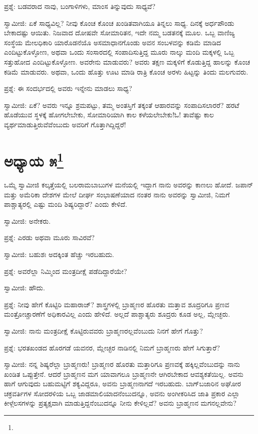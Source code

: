 ಪ್ರಶ್ನೆ: ಬಡವರಾದ ನಾವು, ಬಂಗಾಳಿಗಳು, ಮಾಂಸ ತಿನ್ನುವುದು ಸಾಧ್ಯವೆ?

ಸ್ವಾಮೀಜಿ: ಏಕೆ ಸಾಧ್ಯವಿಲ್ಲ? ನೀವು ಕೊಂಚ ಕೊಂಚ ಖಂಡಿತವಾಗಿಯೂ ತಿನ್ನಲು ಸಾಧ್ಯ. ದಿನಕ್ಕೆ ಅರ್ಧಪೌಂಡು ಬೇಕಾದಷ್ಟು ಆಯಿತು. ನಿಜವಾದ ದೋಷವೇ ಸೋಮಾರಿತನ, ಇದೇ ನಮ್ಮ ಬಡತನಕ್ಕೆ ಮೂಲ. ಒಬ್ಬ ವಾಣಿಜ್ಯ ಸಂಸ್ಥೆಯ ಮೇಲಧಿಕಾರಿ ಯಾರೊಡನೆಯೊ ಅಸಮಾಧಾನಗೊಂಡು ಅವನ ಸಂಬಳವನ್ನು ಕಡಿಮೆ ಮಾಡಿದ ಎಂದಿಟ್ಟುಕೊಳ್ಳೋಣ, ಅಥವಾ ಒಂದು ಸಂಸಾರದಲ್ಲಿ ಸಂಪಾದಿಸುತ್ತಿದ್ದ ಮೂರು ನಾಲ್ಕು ಮಂದಿ ಮಕ್ಕಳಲ್ಲಿ ಒಬ್ಬ ಸತ್ತುಹೋದ ಎಂದಿಟ್ಟುಕೊಳ್ಳೋಣ. ಅವರೇನು ಮಾಡುವರು? ಅವರು ತಕ್ಷಣ ಮಕ್ಕಳಿಗೆ ಕೊಡುತ್ತಿದ್ದ ಹಾಲನ್ನು ಕೊಂಚ ಕಡಿಮೆ ಮಾಡುವರು. ಅಥವಾ, ಒಂದು ಹೊತ್ತು ಊಟ ಮಾಡಿ ರಾತ್ರಿ ಕೊಂಚ ಅರಳು ಹಿಟ್ಟನ್ನು ತಿಂದು ಮಲಗುವರು.

ಪ್ರಶ್ನೆ: ಈ ಸಂದರ್ಭದಲ್ಲಿ ಅವರು ಇನ್ನೇನು ಮಾಡಲು ಸಾಧ್ಯ?

ಸ್ವಾಮೀಜಿ: ಏಕೆ? ಅವರು ಇನ್ನೂ ಶ್ರಮಪಟ್ಟು, ತಮ್ಮ ಅಂತಸ್ತಿಗೆ ತಕ್ಕಂತೆ ಆಹಾರವನ್ನು ಸಂಪಾದಿಸಲಾರರೆ? ಹರಟೆ ಹೊಡೆಯುವ ಸ್ಥಳಕ್ಕೆ ಹೋಗಲೇಬೇಕು, ಸೋಮಾರಿಯಾಗಿ ಕಾಲ ಕಳೆಯಲೇಬೇಕು!ಓ! ತಾವೆಷ್ಟು ಕಾಲ ವ್ಯರ್ಥಮಾಡುತ್ತಿರುವೆವೆಂಬುದು ಅವರಿಗೆ ಗೊತ್ತಾಗಿದ್ದಿದ್ದರೆ!

\chapter{ಅಧ್ಯಾಯ ೫\protect\footnote{}}

ಒಮ್ಮೆ ಸ್ವಾಮೀಜಿ ಕಲ್ಕತ್ತೆಯಲ್ಲಿ ಬಲರಾಮಬಾಬುಗಳ ಮನೆಯಲ್ಲಿ ಇದ್ದಾಗ ನಾನು ಅವರನ್ನು ಕಾಣಲು ಹೋದೆ. ಜಪಾನ್ ಮತ್ತು ಅಮೆರಿಕಾ ದೇಶಗಳ ಮೇಲೆ ದೀರ್ಘ ಸಂಭಾಷಣೆಯಾದ ನಂತರ ನಾನು ಅವರನ್ನು ಸ್ವಾಮೀಜಿ, ನಿಮಗೆ ಪಾಶ್ಚಾತ್ಯರಲ್ಲಿ ಎಷ್ಟು ಮಂದಿ ಶಿಷ್ಯರಿದ್ದಾರೆ? ಎಂದು ಕೇಳಿದೆ.

ಸ್ವಾಮೀಜಿ: ಅನೇಕರು.

ಪ್ರಶ್ನೆ: ಎರಡು ಅಥವಾ ಮೂರು ಸಾವಿರವೆ?

ಸ್ವಾಮೀಜಿ: ಬಹುಶಃ ಅದಕ್ಕಿಂತ ಹೆಚ್ಚು ಇರಬಹುದು.

ಪ್ರಶ್ನೆ: ಅವರೆಲ್ಲಾ ನಿಮ್ಮಿಂದ ಮಂತ್ರದೀಕ್ಷೆ ಪಡೆದಿದ್ದಾರೆಯೇ?

ಸ್ವಾಮೀಜಿ: ಹೌದು.

ಪ್ರಶ್ನೆ: ನೀವು ಹೇಗೆ ಕೊಟ್ಟಿರಿ ಮಹಾರಾಜ್? ಶಾಸ್ತ್ರಗಳಲ್ಲಿ ಬ್ರಾಹ್ಮಣರ ಹೊರತು ಮತ್ತಾವ ಶೂದ್ರರಿಗೂ ಪ್ರಣವ ಮಂತ್ರೋಚ್ಚಾರಣೆಗೆ ಅಧಿಕಾರವಿಲ್ಲ ಎಂದು ಹೇಳಿದೆ. ಅಲ್ಲದೆ ಪಾಶ್ಚಾತ್ಯರು ಶೂದ್ರರು ಕೂಡ ಅಲ್ಲ, ಮ್ಲೇಚ್ಛರು.

ಸ್ವಾಮೀಜಿ: ನಾನು ಮಂತ್ರದೀಕ್ಷೆ ಕೊಟ್ಟಿರುವವರು ಬ್ರಾಹ್ಮಣರಲ್ಲವೆಂಬುದು ನಿನಗೆ ಹೇಗೆ ಗೊತ್ತು?

ಪ್ರಶ್ನೆ: ಭರತಖಂಡದ ಹೊರಗಡೆ ಯವನರ, ಮ್ಲೇಚ್ಛರ ನಾಡಿನಲ್ಲಿ ನಿಮಗೆ ಬ್ರಾಹ್ಮಣರು ಹೇಗೆ ಸಿಗುತ್ತಾರೆ?

ಸ್ವಾಮೀಜಿ: ನನ್ನ ಶಿಷ್ಯರೆಲ್ಲಾ ಬ್ರಾಹ್ಮಣರು! ಬ್ರಾಹ್ಮಣರ ಹೊರತು ಮತ್ತಾರಿಗೂ ಪ್ರಣವಕ್ಕೆ ಹಕ್ಕಿಲ್ಲವೆಂಬುದನ್ನು ನಾನು ಖಂಡಿತ ಒಪ್ಪುತ್ತೇನೆ. ಆದರೆ ಬ್ರಾಹ್ಮಣನ ಮಗ ಯಾವಾಗಲೂ ಬ್ರಾಹ್ಮಣನೇ ಆಗಿರಬೇಕಾದ ಆವಶ್ಯಕತೆಯಿಲ್ಲ. ಅವನು ಹಾಗೆ ಆಗುವುದು ಬಹುಮಟ್ಟಿಗೆ ಶಕ್ಯವಿದ್ದರೂ, ಅವನು ಬ್ರಾಹ್ಮಣನಾಗದೆ ಇರಬಹುದು. ಬಾಗ್‌ಬಜಾರಿನ ಅಘೋರ ಚಕ್ರವರ್ತಿಗಳ ಸೋದರಳಿಯ ಒಬ್ಬ ಜಾಡಮಾಲಿಯಾದನೆಂಬುದನ್ನೂ, ಅವನು ಅಂಗೀಕರಿಸಿದ ಜಾತಿ ಪ್ರಕಾರ ಎಲ್ಲಾ ಕೀಳ್ಗೆಲಸಗಳನ್ನು ಪ್ರತ್ಯಕ್ಷವಾಗಿ ಮಾಡುತ್ತಿದ್ದನೆಂಬುದನ್ನೂ ನೀನು ಕೇಳಿಲ್ಲವೆ? ಅವನು ಬ್ರಾಹ್ಮಣನ ಮಗನಲ್ಲವೇನು?


